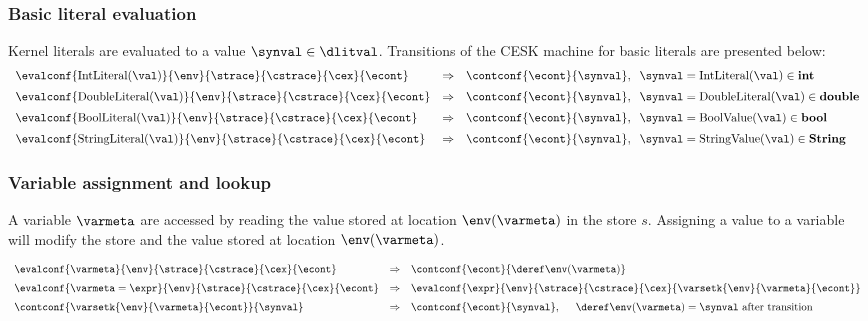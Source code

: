 \documentclass{article}
\begin{document}
\subsubsection{Basic literal evaluation}
\label{subsubsec:basic-literal-eval}
Kernel literals are evaluated to a value $\synval \in \dlitval$. Transitions of the CESK machine for basic literals are presented below:
\[
  \begin{array}{lcll}
	\evalconf{\mathrm{IntLiteral(\val)}}{\env}{\strace}{\cstrace}{\cex}{\econt}
	& \Rightarrow &
	\contconf{\econt}{\synval},
	\hspace{2mm}\synval = \mathrm{IntLiteral(\val)} \in \mathbf{int}\\[2mm]

	\evalconf{\mathrm{DoubleLiteral(\val)}}{\env}{\strace}{\cstrace}{\cex}{\econt}
	& \Rightarrow &
	\contconf{\econt}{\synval},
	\hspace{2mm}\synval = \mathrm{DoubleLiteral(\val)} \in \mathbf{double}\\[2mm]

	\evalconf{\mathrm{BoolLiteral(\val)}}{\env}{\strace}{\cstrace}{\cex}{\econt}
	& \Rightarrow &
	\contconf{\econt}{\synval},
	\hspace{2mm}\synval = \mathrm{BoolValue(\val)} \in \mathbf{bool}\\[2mm]

	\evalconf{\mathrm{StringLiteral(\val)}}{\env}{\strace}{\cstrace}{\cex}{\econt}
	& \Rightarrow &
	\contconf{\econt}{\synval},
	\hspace{2mm}\synval = \mathrm{StringValue(\val)} \in \mathbf{String}

  \end{array}
\]

\subsubsection{Variable assignment and lookup}
\label{subsubsec:variable-assignment-and-lookup}
A variable $\varmeta$ are accessed by reading the value stored at location $\env(\varmeta)$ in the store $s$. Assigning a value to a variable will modify the store and the value stored at location  $\env(\varmeta)$.

\[
  \begin{array}{lcl}
	\evalconf{\varmeta}{\env}{\strace}{\cstrace}{\cex}{\econt}
	& \Rightarrow &
	\contconf{\econt}{\deref\env(\varmeta)}\\[2mm]

	\evalconf{\varmeta = \expr}{\env}{\strace}{\cstrace}{\cex}{\econt}
	& \Rightarrow &
	\evalconf{\expr}{\env}{\strace}{\cstrace}{\cex}{\varsetk{\env}{\varmeta}{\econt}}\\[2mm]

	\contconf{\varsetk{\env}{\varmeta}{\econt}}{\synval}
	& \Rightarrow &
	\contconf{\econt}{\synval}, \hspace{5mm} \deref\env(\varmeta) = \synval \textrm{ after transition}

  \end{array}
\]
\end{document}
